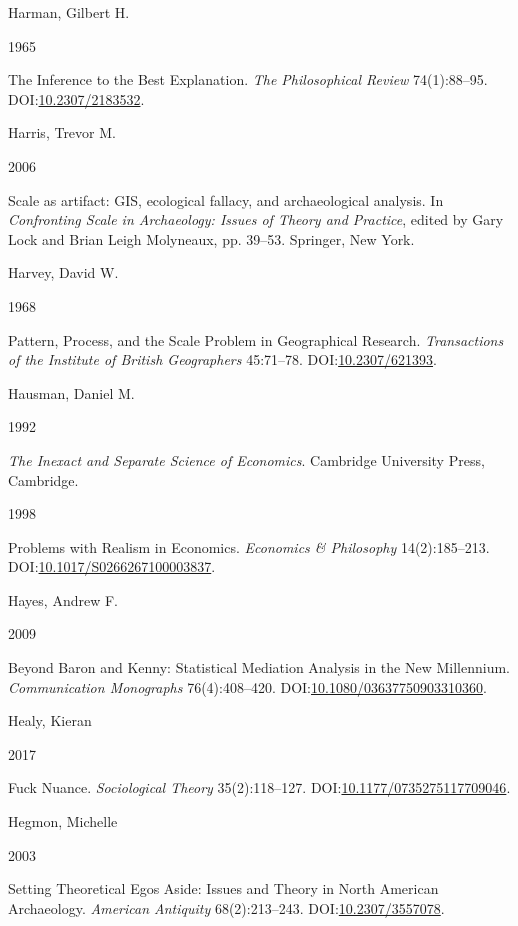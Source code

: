 \documentclass[
  12pt,
  a4paper,
  oneside]{book}
\newlength{\cslhangindent}
\newlength{\csllabelwidth}
\newlength{\cslentryspacingunit} %
\newenvironment{CSLReferences}[2] %
 {%
  \setlength{\parindent}{0pt}
  \ifodd #1
  \let\oldpar\par
  \def\par{\hangindent=\cslhangindent\oldpar}
  \fi
  \setlength{\parskip}{#2\cslentryspacingunit}
 }%
 {}
\newcommand{\CSLBlock}[1]{#1\hfill\break}
\newcommand{\CSLLeftMargin}[1]{\parbox[t]{\csllabelwidth}{#1}}
\newcommand{\CSLRightInline}[1]{\parbox[t]{\linewidth - \csllabelwidth}{#1}\break}
\begin{document}
\begin{CSLReferences}{0}{0}
\leavevmode{}%
\CSLBlock{Harman, Gilbert H.}
\CSLLeftMargin{ 1965}%
\CSLRightInline{{The Inference to the Best Explanation}. \emph{The Philosophical Review} 74(1):88--95. DOI:\href{https://doi.org/10.2307/2183532}{10.2307/2183532}.}

\leavevmode{}%
\CSLBlock{Harris, Trevor M.}
\CSLLeftMargin{ 2006}%
\CSLRightInline{Scale as artifact: GIS, ecological fallacy, and archaeological analysis. In \emph{{Confronting Scale in Archaeology: Issues of Theory and Practice}}, edited by Gary Lock and Brian Leigh Molyneaux, pp. 39--53. Springer, New York.}

\leavevmode{}%
\CSLBlock{Harvey, David W.}
\CSLLeftMargin{ 1968}%
\CSLRightInline{{Pattern, Process, and the Scale Problem in Geographical Research}. \emph{Transactions of the Institute of British Geographers} 45:71--78. DOI:\href{https://doi.org/10.2307/621393}{10.2307/621393}.}

\leavevmode{}%
\CSLBlock{Hausman, Daniel M.}
\CSLLeftMargin{ 1992}%
\CSLRightInline{\emph{{The Inexact and Separate Science of Economics}}. Cambridge University Press, Cambridge.}

\leavevmode{}%
\CSLLeftMargin{ 1998 }%
\CSLRightInline{{Problems with Realism in Economics}. \emph{Economics \& Philosophy} 14(2):185--213. DOI:\href{https://doi.org/10.1017/S0266267100003837}{10.1017/S0266267100003837}.}

\leavevmode{}%
\CSLBlock{Hayes, Andrew F.}
\CSLLeftMargin{ 2009}%
\CSLRightInline{{Beyond Baron and Kenny: Statistical Mediation Analysis in the New Millennium}. \emph{Communication Monographs} 76(4):408--420. DOI:\href{https://doi.org/10.1080/03637750903310360}{10.1080/03637750903310360}.}

\leavevmode{}%
\CSLBlock{Healy, Kieran}
\CSLLeftMargin{ 2017}%
\CSLRightInline{Fuck Nuance. \emph{Sociological Theory} 35(2):118--127. DOI:\href{https://doi.org/10.1177/0735275117709046}{10.1177/0735275117709046}.}

\leavevmode{}%
\CSLBlock{Hegmon, Michelle}
\CSLLeftMargin{ 2003}%
\CSLRightInline{{Setting Theoretical Egos Aside: Issues and Theory in North American Archaeology}. \emph{American Antiquity} 68(2):213--243. DOI:\href{https://doi.org/10.2307/3557078}{10.2307/3557078}.}


\end{CSLReferences}
\end{document}
